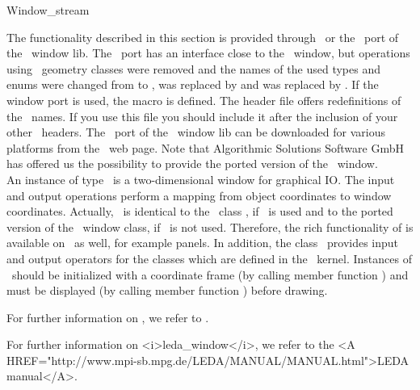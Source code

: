 
\begin{ccRefClass} {Window_stream}



\ccDefinition 

The functionality described in this section is provided through \leda\ or
the \cgal\ port of the \leda\ window lib. The \cgal\ port has an interface
close to the \leda\ window, but operations using \leda\ geometry classes
were removed and the names of the used types and enums were changed from
 to , 
was replaced by  and  was replaced
by .
If the window port is used, the macro  is 
defined. The header file  offers
redefinitions of the \leda\ names. If you use this file you should include
it after the inclusion of your other \cgal\ headers.
The \cgal\ port of the \leda\ window lib can be downloaded for various platforms
from the \cgal\ web page. Note that Algorithmic Solutions Software GmbH 
has offered us the possibility to provide the ported version of the \leda\ 
window.\\

An instance of type \ccRefName\ is a two-dimensional window for
graphical IO. The input and output operations perform a mapping from
object coordinates to window coordinates.
Actually, \ccRefName\ is identical to the \leda\ class ,
if \leda\ is used and to the ported version of the \leda\ window class, if
\leda\ is not used.
Therefore, the rich functionality of  is available on
\ccRefName\ as well, for example panels.
In addition, the class \ccRefName\ provides input and output 
operators for the classes which are defined in the \cgal\ kernel.
Instances of \ccRefName\ should be initialized with a coordinate frame 
(by calling member function
) and must be displayed (by calling member function ) before
drawing.
 
\begin{ccTexOnly}
For further information on , we refer to \cite{cgal:mnsu-lum}.
\end{ccTexOnly}
\begin{ccHtmlOnly}
For further information on <i>leda_window</i>, we refer to the 
<A HREF="http://www.mpi-sb.mpg.de/LEDA/MANUAL/MANUAL.html">LEDA manual</A>.
\end{ccHtmlOnly}



\end{ccRefClass}
